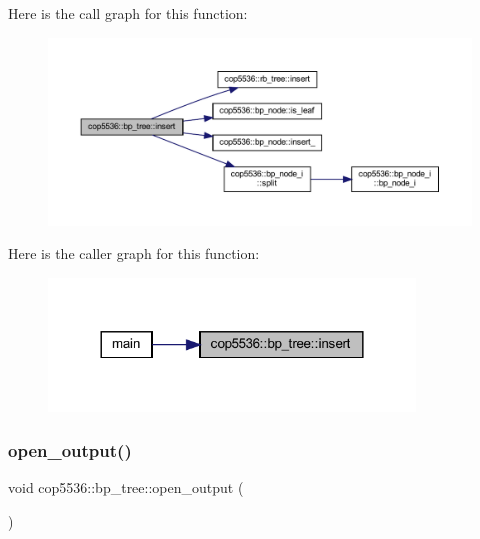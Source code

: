 Here is the call graph for this function\+:
\nopagebreak
\begin{figure}[H]
\begin{center}
\leavevmode
\includegraphics[width=350pt]{classcop5536_1_1bp__tree_a244ebb31e046d28bc2a765d1215c98ac_cgraph}
\end{center}
\end{figure}
Here is the caller graph for this function\+:
\nopagebreak
\begin{figure}[H]
\begin{center}
\leavevmode
\includegraphics[width=276pt]{classcop5536_1_1bp__tree_a244ebb31e046d28bc2a765d1215c98ac_icgraph}
\end{center}
\end{figure}
\mbox{\label{classcop5536_1_1bp__tree_aedfc108a47c4c0fccba58e0fbe4afc85}} 
\subsubsection{open\_output()}
{\footnotesize\ttfamily void cop5536\+::bp\+\_\+tree\+::open\+\_\+output (\begin{DoxyParamCaption}{ }\end{DoxyParamCaption})\hspace{0.3cm}{\ttfamily [inline]}}

